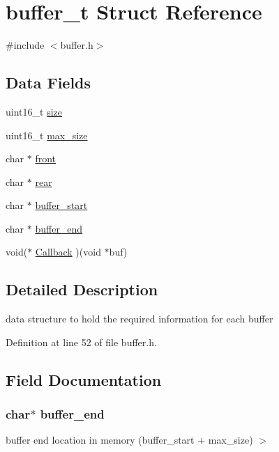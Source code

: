 \hypertarget{structbuffer__t}{}\section{buffer\+\_\+t Struct Reference}
\label{structbuffer__t}


{\ttfamily \#include $<$buffer.\+h$>$}

\subsection*{Data Fields}
\begin{DoxyCompactItemize}
\item 
uint16\+\_\+t \hyperlink{structbuffer__t_aaba88b24a21a6c70c895c0d55f4a69a0}{size}
\item 
uint16\+\_\+t \hyperlink{structbuffer__t_a58516967d6d94fcbcd0b8fc2320e581f}{max\+\_\+size}
\item 
char $\ast$ \hyperlink{structbuffer__t_a76c4b89775aec874cd21ff80a9c099e1}{front}
\item 
char $\ast$ \hyperlink{structbuffer__t_a96c6c547bf6a43ef40eeca3198cce36e}{rear}
\item 
char $\ast$ \hyperlink{structbuffer__t_af127db1c17ed58547ff5125a912d02b9}{buffer\+\_\+start}
\item 
char $\ast$ \hyperlink{structbuffer__t_ab7869299a8099ebb2ed9bdd49962baf2}{buffer\+\_\+end}
\item 
void($\ast$ \hyperlink{structbuffer__t_a7957c810329d9c779aad2a456bd77757}{Callback} )(void $\ast$buf)
\end{DoxyCompactItemize}


\subsection{Detailed Description}
data structure to hold the required information for each buffer 

Definition at line 52 of file buffer.\+h.



\subsection{Field Documentation}
\hypertarget{structbuffer__t_ab7869299a8099ebb2ed9bdd49962baf2}{}
\subsubsection[{buffer\+\_\+end}]{\setlength{\rightskip}{0pt plus 5cm}char$\ast$ buffer\+\_\+end}\label{structbuffer__t_ab7869299a8099ebb2ed9bdd49962baf2}
buffer end location in memory (buffer\+\_\+start + max\+\_\+size) $>$ 

